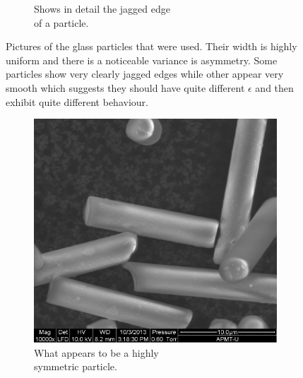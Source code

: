 \begin{figure}[H]
\begin{subfigure}[3b]{0.40\textwidth}
\caption{Shows in detail the jagged edge \\ of a particle.}
\end{subfigure}
\caption{Pictures of the glass particles that were used. Their width is highly uniform and there is a noticeable variance is asymmetry. Some particles show very clearly jagged edges while other appear very smooth which suggests they should have quite different $\epsilon$ and then exhibit quite different behaviour.}
\label{fig:particlepictures}
\end{figure}
 


\begin{figure}[H]
\centering
\begin{subfigure}[3a]{0.40\textwidth}
\includegraphics[width=\textwidth]{figures/method/symmetric.png}
\caption{What appears to be a highly \\ symmetric particle.}\label{fig:symmetricparticle}
\end{subfigure}\hspace{1em}%
\begin{subfigure}[3b]{0.40\textwidth}

\end{subfigure}
\end{figure}
